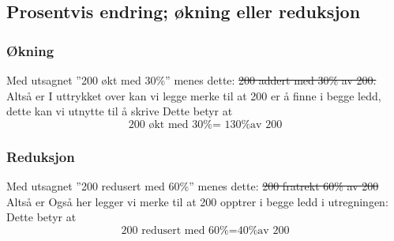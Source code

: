 \subsection{Prosentvis endring; økning eller reduksjon \label{Proendring}}
\subsubsection{Økning} \label{prookning}
Med utsagnet ''200 økt med 30\%'' menes dette:
\st{
200 addert med 30\% av 200.
}
Altså er
I uttrykket over kan vi legge merke  til at 200 er å finne i begge ledd, dette kan vi utnytte til å skrive
Dette betyr at
\[ \text{200 økt med 30\% = 130\% av 200} \] 

\subsubsection{Reduksjon} \label{proredusering}
Med utsagnet ''200 redusert med 60\%'' menes dette:
\st{200 fratrekt 60\% av 200}
Altså er 
Også her legger vi merke til at 200 opptrer i begge ledd i utregningen:
Dette betyr at
\[ \text{200 redusert med 60\%}= \text{40\% av 200} \]


